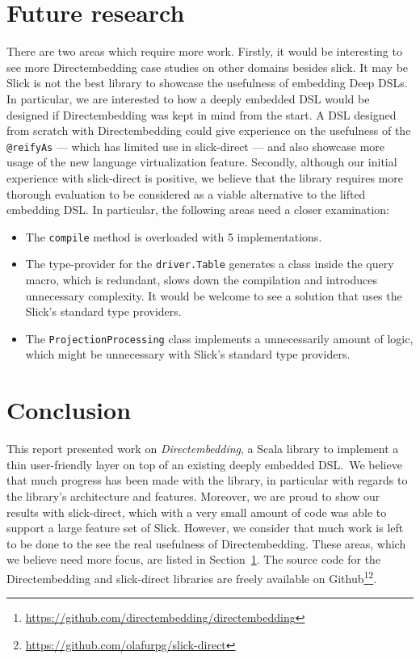 \section{Future research} %
\label{sec:Future_research}
There are two areas which require more work.
Firstly, it would be interesting to see more Directembedding case studies on other domains besides slick.
It may be Slick is not the best library to showcase the usefulness of embedding Deep DSLs.
In particular, we are interested to how a deeply embedded DSL would be designed if Directembedding was kept in mind from the start.
A DSL designed from scratch with Directembedding could give experience on the usefulness of the \texttt{@reifyAs} --- which has limited use in slick-direct --- and also showcase more usage of the new language virtualization feature.
Secondly, although our initial experience with slick-direct is positive, we believe that the library requires more thorough evaluation to be considered as a viable alternative to the lifted embedding DSL.
In particular, the following areas need a closer examination:
\begin{itemize}
    \item The \texttt{compile} method is overloaded with 5 implementations.
    \item The type-provider for the \texttt{driver.Table} generates a class inside the query macro, which is redundant, slows down the compilation and introduces unnecessary complexity. It would be welcome to see a solution that uses the Slick's standard type providers.
    \item The \texttt{ProjectionProcessing} class implements a unnecessarily amount of logic, which might be unnecessary with Slick's standard type providers.
\end{itemize}

\section{Conclusion} %
\label{sec:Conclusion}
This report presented work on \emph{Directembedding}, a Scala library to implement a thin user-friendly layer on top of an existing deeply embedded DSL.\
We believe that much progress has been made with the library, in particular with regards to the library's architecture and features.
Moreover, we are proud to show our results with slick-direct, which with a very small amount of code was able to support a large feature set of Slick.
However, we consider that much work is left to be done to the see the real usefulness of Directembedding.
These areas, which we believe need more focus, are listed in Section~\ref{sec:Future_research}.
The source code for the Directembedding and slick-direct libraries are freely available on Github\footnote{\href{https://github.com/directembedding/directembedding}{https://github.com/directembedding/directembedding}}\footnote{\href{https://github.com/olafurpg/slick-direct}{https://github.com/olafurpg/slick-direct}}.


